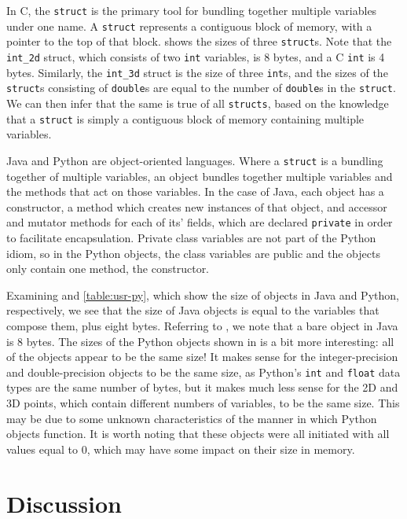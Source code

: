 \documentclass[12pt,letterpaper]{article}
\begin{document}
		In C, the \texttt{struct} is the primary tool for bundling together multiple variables under one name. A \texttt{struct} represents a contiguous block of memory, with a pointer to the top of that block.  shows the sizes of three \texttt{struct}s. Note that the \texttt{int\_2d} struct, which consists of two \texttt{int} variables, is 8 bytes, and a C \texttt{int} is 4 bytes. Similarly, the \texttt{int\_3d} struct is the size of three \texttt{int}s, and the sizes of the \texttt{struct}s consisting of \texttt{double}s are equal to the number of \texttt{double}s in the \texttt{struct}.  We can then infer that the same is true of all \texttt{structs}, based on the knowledge that a \texttt{struct} is simply a contiguous block of memory containing multiple variables.

		Java and Python are object-oriented languages. Where a \texttt{struct} is a bundling together of multiple variables, an object bundles together multiple variables and the methods that act on those variables. In the case of Java, each object has a constructor, a method which creates new instances of that object, and accessor and mutator methods for each of its' fields, which are declared \texttt{private} in order to facilitate encapsulation. Private class variables are not part of the Python idiom, so in the Python objects, the class variables are public and the objects only contain one method, the constructor. 

		Examining  and \cref{table:usr-py}, which show the size of objects in Java and Python, respectively, we see that the size of Java objects is equal to the variables that compose them, plus eight bytes. Referring to , we note that a bare object in Java is 8 bytes. The sizes of the Python objects shown in  is a bit more interesting: all of the objects appear to be the same size! It makes sense for the integer-precision and double-precision objects to be the same size, as Python's \texttt{int} and \texttt{float} data types are the same number of bytes, but it makes much less sense for the 2D and 3D points, which contain different numbers of variables, to be the same size. This may be due to some unknown characteristics of the manner in which Python objects function. It is worth noting that these objects were all initiated with all values equal to 0, which may have some impact on their size in memory.

	\section {Discussion}
\end{document}
